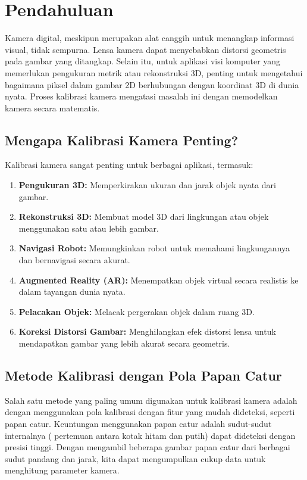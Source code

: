 \documentclass[12pt,a4paper]{article}
\begin{document}
\section{Pendahuluan}
Kamera digital, meskipun merupakan alat canggih untuk menangkap informasi
visual, tidak sempurna. Lensa kamera dapat menyebabkan distorsi geometris pada
gambar yang ditangkap. Selain itu, untuk aplikasi visi komputer yang memerlukan
pengukuran metrik atau rekonstruksi 3D, penting untuk mengetahui bagaimana
piksel dalam gambar 2D berhubungan dengan koordinat 3D di dunia nyata. Proses
kalibrasi kamera mengatasi masalah ini dengan memodelkan kamera secara
matematis.

\subsection{Mengapa Kalibrasi Kamera Penting?}
Kalibrasi kamera sangat penting untuk berbagai aplikasi, termasuk:
\begin{enumerate}[label=\alph*.,itemsep=0cm]
    \item \textbf{Pengukuran 3D:} Memperkirakan ukuran dan jarak objek nyata dari gambar.
    \item \textbf{Rekonstruksi 3D:} Membuat model 3D dari lingkungan atau objek menggunakan satu atau lebih gambar.
    \item \textbf{Navigasi Robot:} Memungkinkan robot untuk memahami lingkungannya dan bernavigasi secara akurat.
    \item \textbf{Augmented Reality (AR):} Menempatkan objek virtual secara realistis ke dalam tayangan dunia nyata.
    \item \textbf{Pelacakan Objek:} Melacak pergerakan objek dalam ruang 3D.
    \item \textbf{Koreksi Distorsi Gambar:} Menghilangkan efek distorsi lensa untuk mendapatkan gambar yang lebih akurat secara geometris.
\end{enumerate}

\subsection{Metode Kalibrasi dengan Pola Papan Catur}
Salah satu metode yang paling umum digunakan untuk kalibrasi kamera adalah
dengan menggunakan pola kalibrasi dengan fitur yang mudah dideteksi, seperti
papan catur. Keuntungan menggunakan papan catur adalah sudut-sudut internalnya
( pertemuan antara kotak hitam dan putih) dapat dideteksi dengan presisi
tinggi. Dengan mengambil beberapa gambar papan catur dari berbagai sudut
pandang dan jarak, kita dapat mengumpulkan cukup data untuk menghitung
parameter kamera.
\end{document}

